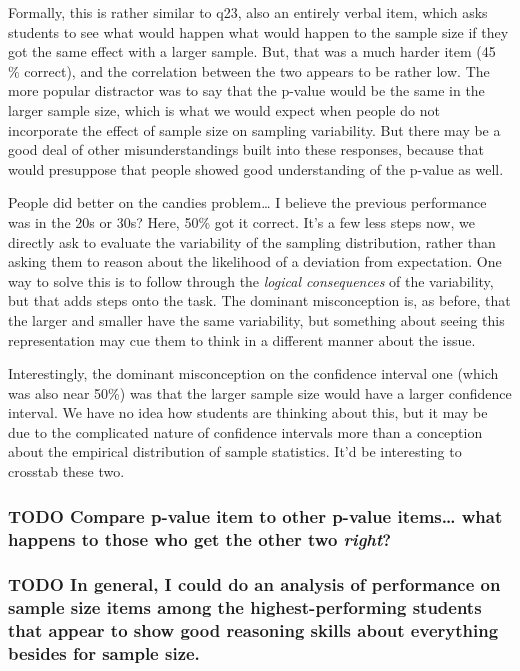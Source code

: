 \documentclass[11pt]{article}
\begin{document}
Formally, this is rather similar to q23, also an entirely verbal item, which asks students to see what would happen what would happen to the sample size if they got the same effect with a larger sample.  But, that was a much harder item (45 \% correct), and the correlation between the two appears to be rather low. The more popular distractor was to say that the p-value would be the same in the larger sample size, which is what we would expect when people do not incorporate the effect of sample size on sampling variability.  But there may be a good deal of other misunderstandings built into these responses, because that would presuppose that people showed good understanding of the p-value as well.

People did better on the candies problem\ldots{} I believe the previous performance was in the 20s or 30s?  Here, 50\% got it correct.  It's a few less steps now, we directly ask to evaluate the variability of the sampling distribution, rather than asking them to reason about the likelihood of a deviation from expectation. One way to solve this is to follow through the \emph{logical consequences} of the variability, but that adds steps onto the task.  The dominant misconception is, as before, that the larger and smaller have the same variability, but something about seeing this representation may cue them to think in a different manner about the issue.

Interestingly, the dominant misconception on the confidence interval one (which was also near 50\%) was that the larger sample size would have a larger confidence interval.  We have no idea how students are thinking about this, but it may be due to the complicated nature of confidence intervals more than a conception about the empirical distribution of sample statistics. It'd be interesting to crosstab these two.


\subsubsection{{\bfseries\sffamily TODO} Compare p-value item to other p-value items\ldots{} what happens to those who get the other two \emph{right}?}
\label{sec-3-2-1}

\subsubsection{{\bfseries\sffamily TODO} In general, I could do an analysis of performance on sample size items among the highest-performing students that appear to show good reasoning skills about everything besides for sample size.}
\label{sec-3-2-2}
\end{document}
